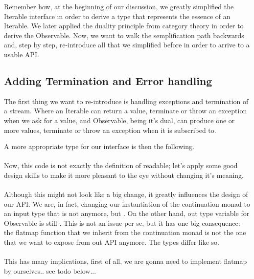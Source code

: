 Remember how, at the beginning of our discussion, we greatly simplified the Iterable interface in order to derive a type that represents the essence of an Iterable. We later applied the duality principle from category theory in order to derive the Observable. Now, we want to walk the semplification path backwards and, step by step, re-introduce all that we simplified before in order to arrive to a usable API.

\subsection{Adding Termination and Error handling}
\label{subsec:subsec01}


The first thing we want to re-introduce is handling exceptions and termination of a stream. Where an Iterable can return a value, terminate or throw an exception when we ask for a value, and Observable, being it's dual, can produce one or more values, terminate or throw an exception when it is subscribed to. 

A more appropriate type for our interface is then the following.\\

\\

Now, this code is not exactly the definition of readable; let's apply some good design skills to make it more pleasant to the eye without changing it's meaning.\\

\\

Although this might not look like a big change, it greatly influences the design of our API. We are, in fact, changing our instantiation of the continuation monad to an input type that is not  anymore, but . On the other hand, out type variable for Observable is still . This is not an issue per se, but it has one big consequence: the flatmap function that we inherit from the continuation monad is not the one that we want to expose from out API anymore. The types differ like so.\\

\\

This has many implications, first of all, we are gonna need to implement flatmap by ourselves.. see todo below...

